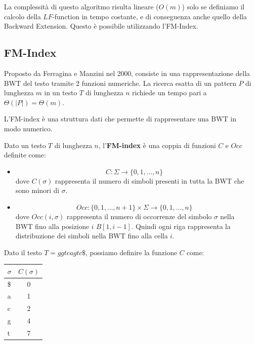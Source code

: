 La complessità di questo algoritmo risulta lineare ($O(m)$) solo se definiamo il
calcolo della $LF$-function in tempo costante, e di conseguenza anche quello della
Backward Extension. Questo è possibile utilizzando l'FM-Index.
\subsection{FM-Index}
Proposto da Ferragina e Manzini nel 2000, consiste in una rappresentazione della
BWT del testo tramite 2 funzioni numeriche. La ricerca esatta di un pattern $P$
di lunghezza $m$ in un testo $T$ di lunghezza $n$ richiede un tempo pari a
$\Theta(|P|) = \Theta(m)$.

L'FM-index è una struttura dati che permette di rappresentare una BWT in modo
numerico.
\begin{definizione}
    Dato un testo $T$ di lunghezza $n$, l'\textbf{FM-index} è una coppia di
    funzioni $C$ e $Occ$ definite come:
    \begin{itemize}
        \item \begin{equation}
                  C: \Sigma \to \{0, 1, \dots, n\}
              \end{equation}
              dove $C(\sigma)$ rappresenta il numero di simboli presenti in tutta
              la BWT che sono minori di $\sigma$.
        \item \begin{equation}
                  Occ: \{0, 1, \dots, n + 1\} \times \Sigma \to \{0, 1, \dots, n\}
              \end{equation}
              dove $Occ(i, \sigma)$ rappresenta il numero di occorrenze del
              simbolo $\sigma$ nella BWT fino alla posizione $i$ $B[1, i - 1]$.
              Quindi ogni riga rappresenta la distribuzione dei simboli nella BWT
              fino alla cella $i$.
    \end{itemize}
\end{definizione}
\begin{esempio}
    Dato il testo $T = ggtcagtc\$$, possiamo definire la funzione $C$ come:
    \begin{table}[!ht]
        \centering
        \begin{tabular}{|l|c|}
            \hline
            \rowcolor[HTML]{EFEFEF}
            \textbf{$\sigma$} & \textbf{$C(\sigma)$} \\ \hline
            \$                & 0                    \\ \hline
            a                 & 1                    \\ \hline
            c                 & 2                    \\ \hline
            g                 & 4                    \\ \hline
            t                 & 7                    \\ \hline
        \end{tabular}
    \end{table}
\end{esempio}
